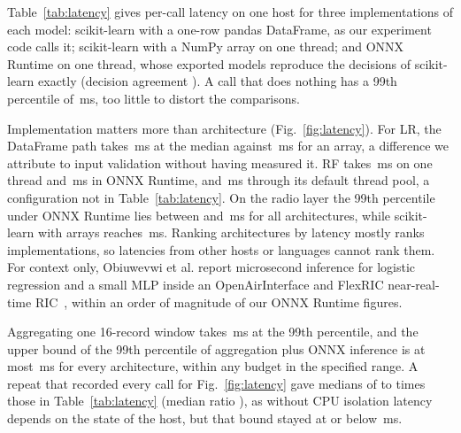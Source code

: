 Table~\ref{tab:latency} gives per-call latency on one host for three implementations of each model: scikit-learn with a one-row pandas DataFrame, as our experiment code calls it; scikit-learn with a NumPy array on one thread; and ONNX Runtime on one thread, whose \LatOnnxN{} exported models reproduce the decisions of scikit-learn exactly (decision agreement \LatOnnxAgreeMin). A call that does nothing has a 99th percentile of \LatFloorPnn{}\,ms, too little to distort the comparisons.

Implementation matters more than architecture (Fig.~\ref{fig:latency}). For LR, the DataFrame path takes \LatLRdfPfifty{}\,ms at the median against \LatLRarrPfifty{}\,ms for an array, a difference we attribute to input validation without having measured it. RF takes \LatRFarrPfifty{}\,ms on one thread and \LatRFonnxPfifty{}\,ms in ONNX Runtime, and \LatRFthreadsPfifty{}\,ms through its default thread pool, a configuration not in Table~\ref{tab:latency}. On the radio layer the 99th percentile under ONNX Runtime lies between \LatOnnxPnnMin{} and \LatOnnxPnnMax{}\,ms for all architectures, while scikit-learn with arrays reaches \LatArrPnnMax{}\,ms. Ranking architectures by latency mostly ranks implementations, so latencies from other hosts or languages cannot rank them. For context only, Obiuwevwi et al. report microsecond inference for logistic regression and a small MLP inside an OpenAirInterface and FlexRIC near-real-time RIC~\cite{obiuwevwi2026realtime}, within an order of magnitude of our ONNX Runtime figures.

Aggregating one 16-record window takes \LatAggPnn{}\,ms at the 99th percentile, and the upper bound of the 99th percentile of aggregation plus ONNX inference is at most \LatEtoEPnnHiMax{}\,ms for every architecture, within any budget in the specified range. A repeat that recorded every call for Fig.~\ref{fig:latency} gave medians of \LatRepMedRatioMin{} to \LatRepMedRatioMax{} times those in Table~\ref{tab:latency} (median ratio \LatRepMedRatio), as without CPU isolation latency depends on the state of the host, but that bound stayed at or below \LatRepEtoEPnnHiMax\,ms.

